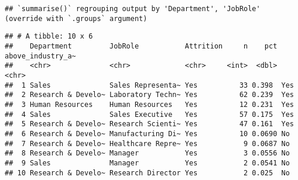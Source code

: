 \documentclass[
]{article}
\begin{document}
\begin{verbatim}
## `summarise()` regrouping output by 'Department', 'JobRole' (override with `.groups` argument)
\end{verbatim}

\begin{verbatim}
## # A tibble: 10 x 6
##    Department         JobRole           Attrition     n    pct above_industry_a~
##    <chr>              <chr>             <chr>     <int>  <dbl> <chr>            
##  1 Sales              Sales Representa~ Yes          33 0.398  Yes              
##  2 Research & Develo~ Laboratory Techn~ Yes          62 0.239  Yes              
##  3 Human Resources    Human Resources   Yes          12 0.231  Yes              
##  4 Sales              Sales Executive   Yes          57 0.175  Yes              
##  5 Research & Develo~ Research Scienti~ Yes          47 0.161  Yes              
##  6 Research & Develo~ Manufacturing Di~ Yes          10 0.0690 No               
##  7 Research & Develo~ Healthcare Repre~ Yes           9 0.0687 No               
##  8 Research & Develo~ Manager           Yes           3 0.0556 No               
##  9 Sales              Manager           Yes           2 0.0541 No               
## 10 Research & Develo~ Research Director Yes           2 0.025  No
\end{verbatim}
\end{document}
